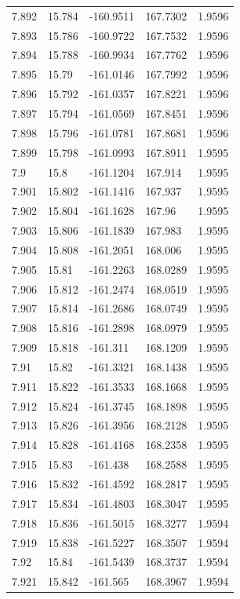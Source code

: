 \begin{tabular}{lllll}
7.892 & 15.784 & -160.9511 & 167.7302 & 1.9596 \\
7.893 & 15.786 & -160.9722 & 167.7532 & 1.9596 \\
7.894 & 15.788 & -160.9934 & 167.7762 & 1.9596 \\
7.895 & 15.79 & -161.0146 & 167.7992 & 1.9596 \\
7.896 & 15.792 & -161.0357 & 167.8221 & 1.9596 \\
7.897 & 15.794 & -161.0569 & 167.8451 & 1.9596 \\
7.898 & 15.796 & -161.0781 & 167.8681 & 1.9596 \\
7.899 & 15.798 & -161.0993 & 167.8911 & 1.9595 \\
7.9 & 15.8 & -161.1204 & 167.914 & 1.9595 \\
7.901 & 15.802 & -161.1416 & 167.937 & 1.9595 \\
7.902 & 15.804 & -161.1628 & 167.96 & 1.9595 \\
7.903 & 15.806 & -161.1839 & 167.983 & 1.9595 \\
7.904 & 15.808 & -161.2051 & 168.006 & 1.9595 \\
7.905 & 15.81 & -161.2263 & 168.0289 & 1.9595 \\
7.906 & 15.812 & -161.2474 & 168.0519 & 1.9595 \\
7.907 & 15.814 & -161.2686 & 168.0749 & 1.9595 \\
7.908 & 15.816 & -161.2898 & 168.0979 & 1.9595 \\
7.909 & 15.818 & -161.311 & 168.1209 & 1.9595 \\
7.91 & 15.82 & -161.3321 & 168.1438 & 1.9595 \\
7.911 & 15.822 & -161.3533 & 168.1668 & 1.9595 \\
7.912 & 15.824 & -161.3745 & 168.1898 & 1.9595 \\
7.913 & 15.826 & -161.3956 & 168.2128 & 1.9595 \\
7.914 & 15.828 & -161.4168 & 168.2358 & 1.9595 \\
7.915 & 15.83 & -161.438 & 168.2588 & 1.9595 \\
7.916 & 15.832 & -161.4592 & 168.2817 & 1.9595 \\
7.917 & 15.834 & -161.4803 & 168.3047 & 1.9595 \\
7.918 & 15.836 & -161.5015 & 168.3277 & 1.9594 \\
7.919 & 15.838 & -161.5227 & 168.3507 & 1.9594 \\
7.92 & 15.84 & -161.5439 & 168.3737 & 1.9594 \\
7.921 & 15.842 & -161.565 & 168.3967 & 1.9594 \\

\end{tabular}
